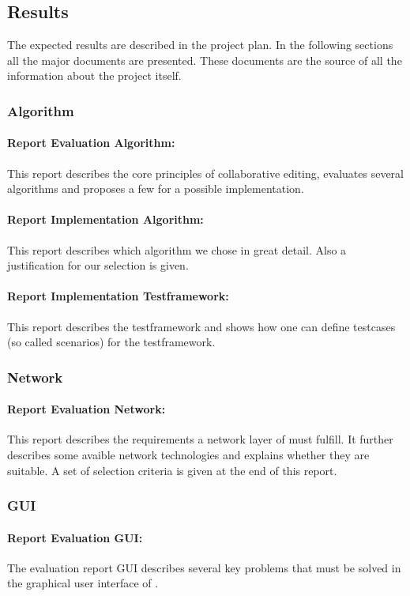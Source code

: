 \documentclass[11pt,a4paper]{article}
\begin{document}
\subsection{Results}
The expected results are described in the project plan. In the following sections all the major documents are presented. These documents are the source of all the information about the project itself.

\subsubsection{Algorithm}
\paragraph{Report Evaluation Algorithm:} 
This report describes the core principles of collaborative editing, evaluates several algorithms and proposes a few for a possible implementation.

\paragraph{Report Implementation Algorithm:} 
This report describes which algorithm we chose in great detail. Also a justification for our selection is given.

\paragraph{Report Implementation Testframework:}
This report describes the testframework and shows how one can define testcases (so called scenarios) for the testframework.

\subsubsection{Network}
\paragraph{Report Evaluation Network:}
This report describes the requirements a network layer of \ace must fulfill. It further describes some avaible network technologies and explains whether they are suitable. A set of selection criteria is given at the end of this report.

\subsubsection{GUI}
\paragraph{Report Evaluation GUI:}
The evaluation report GUI describes several key problems that must be solved in the graphical user interface of \ace.
\end{document}
